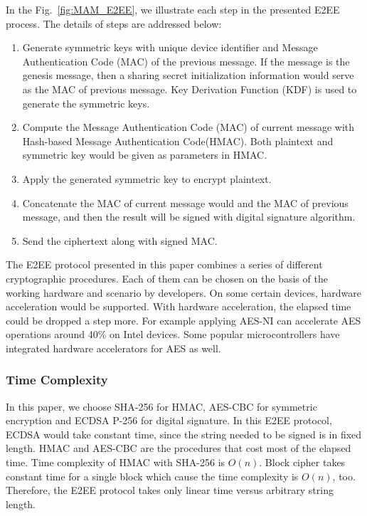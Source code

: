 \documentclass[conference]{IEEEtran}
\begin{document}
In the Fig.~\ref{fig:MAM_E2EE}, we illustrate each step in the presented E2EE process. The details of steps are addressed below:

\begin{enumerate}
    \item Generate symmetric keys with unique device identifier and Message Authentication Code (MAC) of the previous message. If the message is the genesis message, then a sharing secret initialization information would serve as the MAC of previous message. Key Derivation Function (KDF) is used to generate the symmetric keys.
    \item Compute the Message Authentication Code (MAC) of current message with Hash-based Message Authentication Code(HMAC). Both plaintext and symmetric key would be given as parameters in HMAC.
    \item Apply the generated symmetric key to encrypt plaintext.
    \item Concatenate the MAC of current message would and the MAC of previous message, and then the result will be signed with digital signature algorithm.
    \item Send the ciphertext along with signed MAC.
\end{enumerate}

The E2EE protocol presented in this paper combines a series of different cryptographic procedures. Each of them can be chosen on the basis of the working hardware and scenario by developers. On some certain devices, hardware acceleration would be supported. With hardware acceleration, the elapsed time could be dropped a step more. For example applying AES-NI can accelerate AES operations around 40\% on Intel devices.\cite{AES-NI-Acceleration} Some popular microcontrollers have integrated hardware accelerators for AES as well.\cite{stm}

\subsubsection{Time Complexity}
In this paper, we choose SHA-256 for HMAC, AES-CBC for symmetric encryption and ECDSA P-256 for digital signature. In this E2EE protocol, ECDSA would take constant time, since the string needed to be signed is in fixed length. HMAC and AES-CBC are the procedures that cost most of the elapsed time. Time complexity of HMAC with SHA-256 is $O(n)$.\cite{hmac_time_complexity} Block cipher takes constant time for a single block which cause the time complexity is $O(n)$, too. Therefore, the E2EE protocol takes only linear time versus arbitrary string length.
\end{document}
